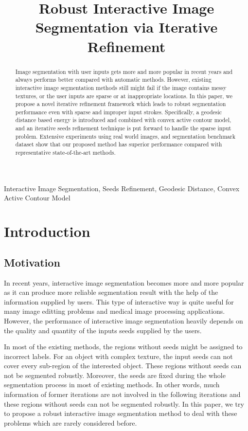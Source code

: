 \documentclass{article}
\title{Robust Interactive Image Segmentation via Iterative Refinement}
\begin{document}
%
\maketitle
%
\begin{abstract}
Image segmentation with user inputs gets more and more popular in recent years and always performs better compared with automatic methods. However, existing interactive image segmentation methods still might fail if the image contains messy textures, or the user inputs are sparse or at inappropriate locations. In this paper, we propose a novel iterative refinement framework which leads to robust segmentation performance even with sparse and improper input strokes. Specifically, a geodesic distance based energy is introduced and combined with convex active contour model, and an iterative seeds refinement technique is put forward to handle the sparse input problem. Extensive experiments using real world images, and segmentation benchmark dataset show that our proposed method has superior performance compared with representative state-of-the-art methods.
\end{abstract}
%
\begin{keywords}
Interactive Image Segmentation, Seeds Refinement, Geodesic Distance, Convex Active Contour Model
\end{keywords}
%
\section{Introduction}
\label{sec:intro}
%
\subsection{Motivation}
%
In recent years, interactive image segmentation becomes more and more popular as it can produce more reliable segmentation result with the help of the information supplied by users. This type of interactive way is quite useful for many image editting problems and medical image processing applications. However, the performance of interactive image segmentation heavily depends on the quality and quantity of the inputs seeds supplied by the users.

In most of the existing methods, the regions without seeds might be assigned to incorrect labels. For an object with complex texture, the input seeds can not cover every sub-region of the interested object. These regions without seeds can not be segmented robustly. Moreover, the seeds are fixed during the whole segmentation process in most of existing methods. In other words, much information of former iterations are not involved in the following iterations and these regions without seeds can not be segmented robustly. In this paper, we try to propose a robust interactive image segmentation method to deal with these problems which are rarely considered before.
%
\end{document}
